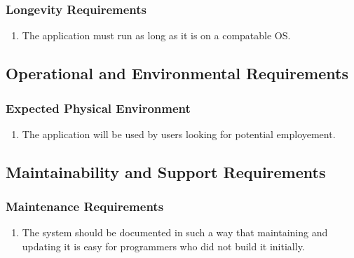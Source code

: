 \documentclass[english]{article}
\begin{document}
\subsubsection{Longevity Requirements}
\label{ssub:longevity_requirements}
\begin{enumerate}[{LONGR}1. ]
\item The application must run as long as it is on a compatable OS.
\end{enumerate}


\subsection{Operational and Environmental Requirements}
\label{sub:operational_and_environmental_requirements}

\subsubsection{Expected Physical Environment}
\label{ssub:expected_physical_environment}
\begin{enumerate}[{EPE}1. ]
\item The application will be used by users looking for potential employement.

\end{enumerate}



\subsection{Maintainability and Support Requirements}
\label{sub:maintainability_and_support_requirements}

\subsubsection{Maintenance Requirements}
\label{ssub:maintenance_requirements}
\begin{enumerate}[{MR}1. ]
\item The system should be documented in such a way that maintaining and updating it is easy for programmers who did not build it initially.

\end{enumerate}
\end{document}
